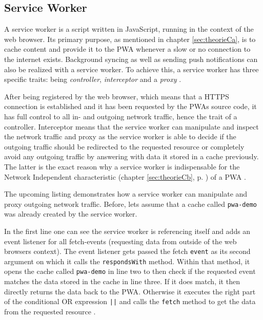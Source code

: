 \subsection{Service Worker}
\label{sec:theorieCc}

A service worker is a script written in JavaScript, running in the context of the web browser. Its primary purpose, as mentioned in chapter \ref{sec:theorieCa}, is to cache content and provide it to the  \acs{PWA} whenever a slow or no connection to the internet exists. Background syncing as well as sending push notifications can also be realized with a service worker. To achieve this, a service worker has three specific traits: being \textit{controller}, \textit{interceptor} and a \textit{proxy} \cite[p. 176]{liebelProgressiveWebApps2019}.

After being registered by the web browser, which means that a HTTPS connection is established and it has been requested by the  \acs{PWA}s source code, it has full control to all in- and outgoing network traffic, hence the trait of a controller. Interceptor means that the service worker can manipulate and inspect the network traffic and proxy as the service worker is able to decide if the outgoing traffic should be redirected to the requested resource or completely avoid any outgoing traffic by answering with data it stored in a cache previously. The latter is the exact reason why a service worker is indispensable for the Network Independent characteristic (chapter \ref{sec:theorieCb}, p. \pageref{sec:theorieCb}) of a  \acs{PWA} \cite[p. 176-177]{liebelProgressiveWebApps2019}.

The upcoming listing demonstrates how a service worker can manipulate and proxy outgoing network traffic. Before, lets assume that a cache called \texttt{pwa-demo} was already created by the service worker.

\begin{center}
	\begin{minipage}{\textwidth}
		
	\end{minipage}
\end{center}

In the first line one can see the service worker is referencing itself and adds an event listener for all fetch-events (requesting data from outside of the web browsers context). The event listener gets passed the fetch \texttt{event} as its second argument on which it calls the \texttt{respondsWith} method. Within that method, it opens the cache called \texttt{pwa-demo} in line two to then check if the requested event matches the data stored in the cache in line three. If it does match, it then directly returns the data back to the  \acs{PWA}. Otherwise it executes the right part of the conditional OR expression \texttt{||} and calls the \texttt{fetch} method to get the data from the requested resource \cite[p. 60]{liebelProgressiveWebApps2019}.

